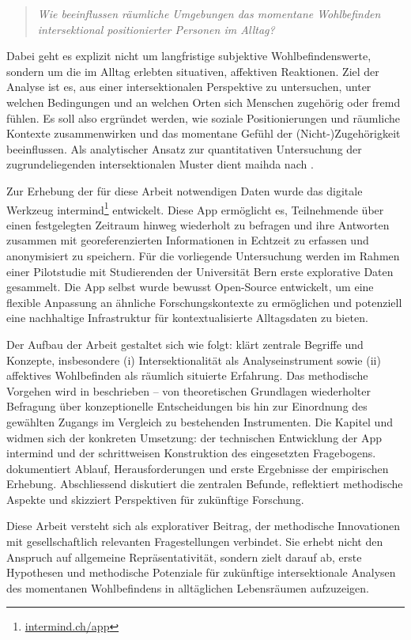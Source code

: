 \begin{quote}
\emph{Wie beeinflussen räumliche Umgebungen das momentane Wohlbefinden intersektional positionierter Personen im Alltag?}
\end{quote}

Dabei geht es explizit nicht um langfristige subjektive Wohlbefindenswerte, sondern um die im Alltag erlebten situativen, affektiven Reaktionen. Ziel der Analyse ist es, aus einer intersektionalen Perspektive zu untersuchen, unter welchen Bedingungen und an welchen Orten sich Menschen zugehörig oder fremd fühlen. Es soll also ergründet werden, wie soziale Positionierungen und räumliche Kontexte zusammenwirken und das momentane Gefühl der (Nicht-)Zugehörigkeit beeinflussen. Als analytischer Ansatz zur quantitativen Untersuchung der zugrundeliegenden intersektionalen Muster dient \gls{maihda} nach \textcite{grossModellingIntersectionalityQuantitative2023}.

Zur Erhebung der für diese Arbeit notwendigen Daten wurde das digitale Werkzeug \gls{intermind}\footnote{\href{https://intermind.ch/app}{intermind.ch/app}} entwickelt. Diese App ermöglicht es, Teilnehmende über einen festgelegten Zeitraum hinweg wiederholt zu befragen und ihre Antworten zusammen mit georeferenzierten Informationen in Echtzeit zu erfassen und anonymisiert zu speichern. Für die vorliegende Untersuchung werden im Rahmen einer Pilotstudie mit Studierenden der Universität Bern erste explorative Daten gesammelt. Die App selbst wurde bewusst Open-Source entwickelt, um eine flexible Anpassung an ähnliche Forschungskontexte zu ermöglichen und potenziell eine nachhaltige Infrastruktur für kontextualisierte Alltagsdaten zu bieten.


Der Aufbau der Arbeit gestaltet sich wie folgt:  klärt zentrale Begriffe und Konzepte, insbesondere (i) Intersektionalität als Analyseinstrument sowie (ii) affektives Wohlbefinden als räumlich situierte Erfahrung. Das methodische Vorgehen wird in  beschrieben -- von theoretischen Grundlagen wiederholter Befragung über konzeptionelle Entscheidungen bis hin zur Einordnung des gewählten Zugangs im Vergleich zu bestehenden Instrumenten. Die Kapitel  und  widmen sich der konkreten Umsetzung: der technischen Entwicklung der App \gls{intermind} und der schrittweisen Konstruktion des eingesetzten Fragebogens.  dokumentiert Ablauf, Herausforderungen und erste Ergebnisse der empirischen Erhebung. Abschliessend diskutiert  die zentralen Befunde, reflektiert methodische Aspekte und skizziert Perspektiven für zukünftige Forschung.

Diese Arbeit versteht sich als explorativer Beitrag, der methodische Innovationen mit gesellschaftlich relevanten Fragestellungen verbindet. Sie erhebt nicht den Anspruch auf allgemeine Repräsentativität, sondern zielt darauf ab, erste Hypothesen und methodische Potenziale für zukünftige intersektionale Analysen des momentanen Wohlbefindens in alltäglichen Lebensräumen aufzuzeigen.